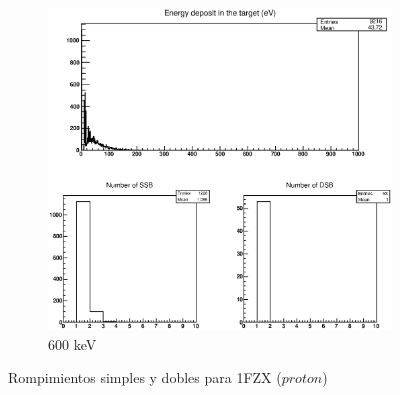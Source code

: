 \begin{figure}
\begin{subfigure}{.5\textwidth}
  \includegraphics[width=.78\linewidth]{./Figures/88.eps}
  \caption{600 keV}
  \label{fig:subi8}
\end{subfigure}
\caption{Rompimientos simples y dobles para 1FZX ($proton$)}
\label{fig:p2}
\end{figure}




